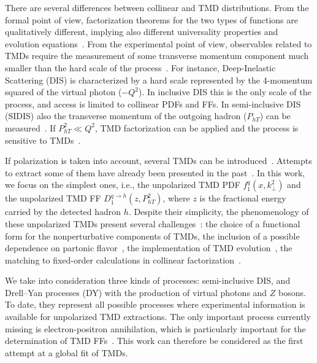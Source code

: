\documentclass[aps,preprintnumbers,showpacs,nofootinbib,superscriptaddress,floatfix]{revtex4}
\newcommand{\T}{\perp}
\begin{document}
There are several differences between collinear and TMD distributions. From
the formal point of view, factorization theorems for the two types of
functions are qualitatively different, implying also different universality
properties and evolution equations~\cite{Rogers:2015sqa}. From the
experimental point 
of view, observables related to TMDs require the measurement of some transverse
momentum component much smaller than the hard scale of the
process~\cite{Bacchetta:2016ccz,Radici:2016hbh}.  For
instance, Deep-Inelastic Scattering (DIS) is characterized by a hard scale represented by the
4-momentum squared of the virtual photon ($-Q^2$). In inclusive DIS this is
the only scale of the process, and access is limited to collinear PDFs
and FFs. In semi-inclusive DIS (SIDIS) also the transverse momentum of the
outgoing  
hadron ($P_{hT}$) can be measured~\cite{Mulders:1995dh,Bacchetta:2006tn}. 
If $P_{hT}^2\ll Q^2$, TMD
factorization can be applied and the process is sensitive to
TMDs~\cite{Collins:2011zzd}. 


If polarization is taken into account, several TMDs can be
introduced~\cite{Mulders:1995dh,Boer:1997nt,%
Bacchetta:2000jk,%
Mulders:2000sh,%
Boer:2016xqr%
}. Attempts to extract some of them have already been presented in the past~\cite{Bacchetta:2011gx,Anselmino:2012aa,Echevarria:2014xaa,Anselmino:2016uie,%
Lu:2009ip,Barone:2015ksa,%
Lefky:2014eia,%
Anselmino:2013vqa,Kang:2015msa%
}.  In
this work, we focus on the simplest ones, i.e., the unpolarized TMD
PDF $f_1^q(x,k_{\T}^2)$ and the unpolarized TMD
FF $D_1^{q \to h}(z,P_{hT}^2)$, where $z$ is
  the fractional energy carried by the detected hadron $h$. Despite their
  simplicity, the phenomenology of these unpolarized TMDs present several
  challenges~\cite{Signori:2016lvd}: the choice of a functional form 
  for the nonperturbative components of TMDs, 
  the inclusion of a possible dependence on partonic
  flavor~\cite{Signori:2013mda}, the implementation of TMD
  evolution~\cite{Bacchetta:2015ora,Rogers:2015sqa}, the matching to
  fixed-order calculations in collinear
  factorization~\cite{Collins:2016hqq}. 

We take into consideration three kinds of processes: semi-inclusive DIS, and
Drell--Yan processes (DY) with the production of virtual photons and $Z$
bosons. To date, they represent 
all possible processes
  where experimental information is available for unpolarized TMD
  extractions. 
The only important
process currently missing is electron-positron annihilation, which is
particularly important for the determination of TMD
FFs~\cite{Bacchetta:2015ora}. This work can therefore be considered as the
first attempt at a global fit of TMDs.  
\end{document}

